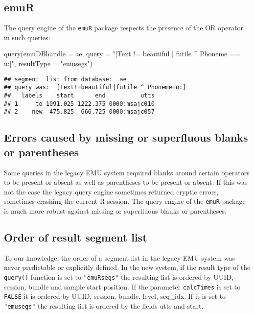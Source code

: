 \documentclass[
]{book}
\newenvironment{Shaded}{\begin{snugshade}}{\end{snugshade}}
\newcommand{\AttributeTok}[1]{\textcolor[rgb]{0.77,0.63,0.00}{#1}}
\newcommand{\FunctionTok}[1]{\textcolor[rgb]{0.00,0.00,0.00}{#1}}
\newcommand{\NormalTok}[1]{#1}
\newcommand{\StringTok}[1]{\textcolor[rgb]{0.31,0.60,0.02}{#1}}
\begin{document}
\hypertarget{emur-1}{%
\subsection{emuR}\label{emur-1}}

The query engine of the \texttt{emuR} package respects the presence of the OR operator in such queries:

\begin{Shaded}
\begin{Highlighting}[]
\FunctionTok{query}\NormalTok{(}\AttributeTok{emuDBhandle =}\NormalTok{ ae,}
      \AttributeTok{query =} \StringTok{"[Text != beautiful | futile \^{} Phoneme == u:]"}\NormalTok{,}
      \AttributeTok{resultType =} \StringTok{"emusegs"}\NormalTok{)}
\end{Highlighting}
\end{Shaded}

\begin{verbatim}
## segment  list from database:  ae
## query was:  [Text!=beautiful|futile ^ Phoneme=u:]
##   labels    start      end          utts
## 1     to 1091.025 1222.375 0000:msajc010
## 2    new  475.825  666.725 0000:msajc057
\end{verbatim}

\hypertarget{errors-caused-by-missing-or-superfluous-blanks-or-parentheses}{%
\subsection{Errors caused by missing or superfluous blanks or parentheses}\label{errors-caused-by-missing-or-superfluous-blanks-or-parentheses}}

Some queries in the legacy EMU system required blanks around certain operators to be present or absent as well as parentheses to be present or absent. If this was not the case the legacy query engine sometimes returned cryptic errors, sometimes crashing the current R session. The query engine of the \texttt{emuR} package is much more robust against missing or superfluous blanks or parentheses.

\hypertarget{order-of-result-segment-list}{%
\subsection{Order of result segment list}\label{order-of-result-segment-list}}

To our knowledge, the order of a segment list in the legacy EMU system was never predictable or explicitly defined. In the new system, if the result type of the \texttt{query()} function is set to \texttt{"emuRsegs"} the resulting list is ordered by UUID, session, bundle and sample start position. If the parameter \texttt{calcTimes} is set to \texttt{FALSE} it is ordered by UUID, session, bundle, level, seq\_idx. If it is set to \texttt{"emusegs"} the resulting list is ordered by the fields utts and start.
\end{document}
